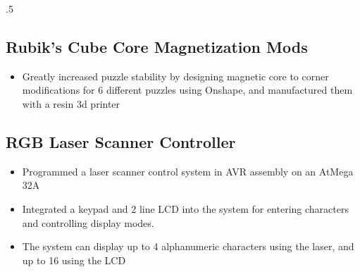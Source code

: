 \documentclass{article}
\begin{document}
\begin{spacing}{.5}
{	\subsection{Rubik's Cube Core Magnetization Mods \hfill {}}
		\begin{itemize}[label=--,itemsep=-.35ex]
			\item \large{Greatly increased puzzle stability by designing magnetic core to corner modifications for 6 different puzzles using Onshape, and manufactured them with a resin 3d printer}
		\end{itemize}
	\subsection{RGB Laser Scanner Controller \hfill {}}
		\begin{itemize}[label=--,itemsep=-.35ex]
			\item \large{Programmed a laser scanner control system in AVR assembly on an AtMega 32A}
			\item \large{Integrated a keypad and 2 line LCD into the system for entering characters and controlling display modes.}
			\item \large{The system can display up to 4 alphanumeric characters using the laser, and up to 16 using the LCD}
		\end{itemize}

}
\end{spacing}
\end{document}
